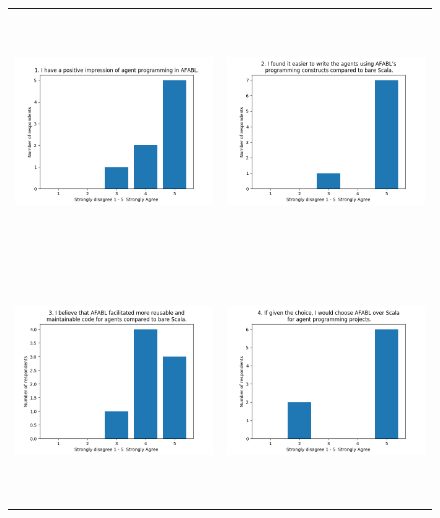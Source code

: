 \begin{figure}[h!]
\begin{tabular}{cc}\\
  \includegraphics[height=2.5in]{afabl-impression.png} & \includegraphics[height=2.5in]{afabl-easier-overall.png} \\
  \includegraphics[height=2.5in]{afabl-better-maintenance.png} & \includegraphics[height=2.5in]{afabl-choice.png} \\

\end{tabular}
\end{figure}
